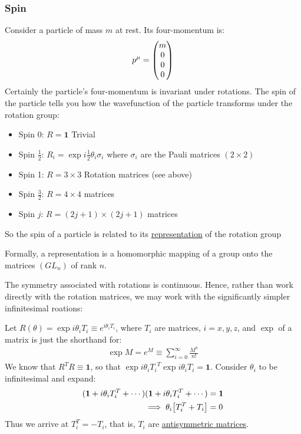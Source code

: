 \subsubsection{Spin}
Consider a particle of mass $m$ at rest. Its four-momentum is:
\begin{align*}
  p^\mu=\pmqty{m\\0\\0\\0}
\end{align*}
Certainly the particle's four-momentum is invariant under rotations. The spin of the particle tells you how the wavefunction of the particle transforms  under the rotation group:
\begin{itemize}
\item Spin 0: $R=\bm{1}$ Trivial
\item Spin $\frac12$: $R_i=\exp{i\frac12\theta_i\sigma_i}$ where $\sigma_i$ are the Pauli matrices $(2\times2)$
\item Spin 1: $R=3\times3$ Rotation matrices (see above)
\item Spin $\frac32$: $R=4\times4$ matrices
\item Spin $j$: $R=(2j+1)\times(2j+1)$ matrices
\end{itemize}
So the spin of a particle is related to its \underline{representation} of the rotation group

Formally, a representation is a homomorphic mapping of a group onto the matrices $(GL_n)$ of rank $n$.

The symmetry associated with rotations is continuous. Hence, rather than work directly with the rotation matrices, we may work with the significantly simpler infinitesimal roations:

Let $R(\theta)=\exp{i\theta_i T_i}\equiv e^{i\theta_i T_i}$, where $T_i$ are matrices, $i=x,y,z$, and $\exp$ of a matrix is just the shorthand for:
\begin{align*}
  \exp{M}=e^M\equiv\sum_{i=0}^\infty\frac{M^n}{n!}
\end{align*}
We know that $R^TR\equiv\bm{1}$, so that $\exp{i\theta_iT_i}^T\exp{i\theta_iT_i}=\bm{1}$. Consider $\theta_i$ to be infinitesimal and expand:
\begin{align*}
  (\bm{1}+i\theta_iT_i^T+\cdots)
  (\bm{1}+i\theta_iT_i^T+\cdots)&=\bm{1}\\
  \implies \theta_i\qty[T_i^T+T_i]&=0
\end{align*}
Thus we arrive at $T_i^T=-T_i$, that is, $T_i$ are \underline{antisymmetric matrices}.

